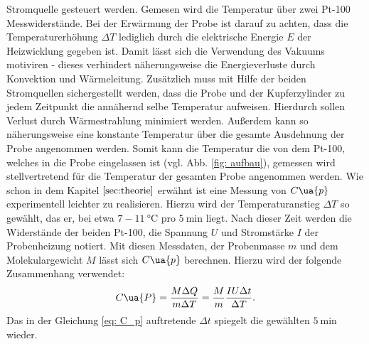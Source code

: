Stromquelle gesteuert werden. Gemesen wird die Temperatur über zwei
Pt-100 Messwiderstände. Bei der Erwärmung der Probe ist darauf zu achten, dass
die Temperaturerhöhung $\Delta T$ lediglich durch die elektrische Energie $E$
der Heizwicklung gegeben ist. Damit lässt sich die Verwendung des Vakuums motiviren -
dieses verhindert näherungsweise die Energieverluste durch Konvektion und
Wärmeleitung. Zusätzlich muss mit Hilfe der beiden Stromquellen sichergestellt
werden, dass die Probe und der Kupferzylinder zu jedem Zeitpunkt die annähernd
selbe Temperatur aufweisen. Hierdurch sollen Verlust durch Wärmestrahlung minimiert werden.
Außerdem kann so näherungsweise eine konstante Temperatur über die gesamte Ausdehnung der Probe
angenommen werden. Somit kann die Temperatur die von dem Pt-100, welches in die Probe eingelassen
ist (vgl. Abb. \ref{fig: aufbau}), gemessen wird stellvertretend für die Temperatur
der gesamten Probe angenommen werden.
Wie schon in dem Kapitel $\ref{sec:theorie}$ erwähnt
ist eine Messung von $C\ua{p}$ experimentell leichter zu realisieren.
Hierzu wird der Temperaturanstieg $\Delta T$ so gewählt, das er, bei
etwa $7-\SI{11}{\degreeCelsius}$ pro $\SI{5}{\minute}$ liegt. Nach dieser Zeit werden die
Widerstände der beiden Pt-100, die Spannung $U$ und Stromstärke $I$ der Probenheizung notiert.
Mit diesen Messdaten, der Probenmasse $m$ und dem Molekulargewicht $M$ lässt sich $C\ua{p}$
berechnen. Hierzu wird der folgende Zusammenhang verwendet:
\begin{equation}
  \label{eq: C_p}
  C\ua{P}=\frac{M \Delta Q}{m\Delta T} = \frac{M}{m}\frac{IU\Delta t}{\Delta T}.
\end{equation}
Das in der Gleichung \eqref{eq: C_p} auftretende $\Delta t$ spiegelt die gewählten $\SI{5}{\minute}$
wieder.
